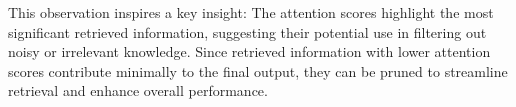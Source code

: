 \documentclass[11pt]{article}
\newcommand{\harry}[1]{{\color{orange}[Harry:#1]}}
\newcommand{\yu}[1]{{\color{brown}[yu:#1]}}
\begin{document}
This observation inspires a key insight: 
The attention scores highlight the most significant retrieved information, suggesting their potential use in filtering out noisy or irrelevant knowledge. Since retrieved information with lower attention scores contribute minimally to the final output, they can be pruned to streamline retrieval and enhance overall performance. 
\end{document}
